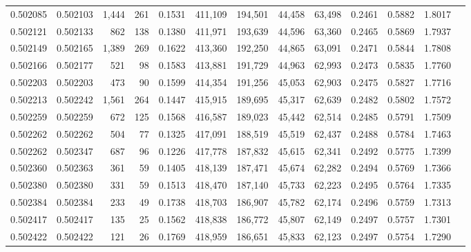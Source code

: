 \begin{tabular}{rrrrrrrrrrrrr}
0.502085 & 0.502103 & 1,444 &   261 &                                     0.1531 & 411,109 & 194,501 &  44,458 &  63,498 & 0.2461 & 0.5882 & 1.8017 \\
0.502121 & 0.502133 &   862 &   138 &                                     0.1380 & 411,971 & 193,639 &  44,596 &  63,360 & 0.2465 & 0.5869 & 1.7937 \\
0.502149 & 0.502165 & 1,389 &   269 &                                     0.1622 & 413,360 & 192,250 &  44,865 &  63,091 & 0.2471 & 0.5844 & 1.7808 \\
0.502166 & 0.502177 &   521 &    98 &                                     0.1583 & 413,881 & 191,729 &  44,963 &  62,993 & 0.2473 & 0.5835 & 1.7760 \\
0.502203 & 0.502203 &   473 &    90 &                                     0.1599 & 414,354 & 191,256 &  45,053 &  62,903 & 0.2475 & 0.5827 & 1.7716 \\
0.502213 & 0.502242 & 1,561 &   264 &                                     0.1447 & 415,915 & 189,695 &  45,317 &  62,639 & 0.2482 & 0.5802 & 1.7572 \\
0.502259 & 0.502259 &   672 &   125 &                                     0.1568 & 416,587 & 189,023 &  45,442 &  62,514 & 0.2485 & 0.5791 & 1.7509 \\
0.502262 & 0.502262 &   504 &    77 &                                     0.1325 & 417,091 & 188,519 &  45,519 &  62,437 & 0.2488 & 0.5784 & 1.7463 \\
0.502262 & 0.502347 &   687 &    96 &                                     0.1226 & 417,778 & 187,832 &  45,615 &  62,341 & 0.2492 & 0.5775 & 1.7399 \\
0.502360 & 0.502363 &   361 &    59 &                                     0.1405 & 418,139 & 187,471 &  45,674 &  62,282 & 0.2494 & 0.5769 & 1.7366 \\
0.502380 & 0.502380 &   331 &    59 &                                     0.1513 & 418,470 & 187,140 &  45,733 &  62,223 & 0.2495 & 0.5764 & 1.7335 \\
0.502384 & 0.502384 &   233 &    49 &                                     0.1738 & 418,703 & 186,907 &  45,782 &  62,174 & 0.2496 & 0.5759 & 1.7313 \\
0.502417 & 0.502417 &   135 &    25 &                                     0.1562 & 418,838 & 186,772 &  45,807 &  62,149 & 0.2497 & 0.5757 & 1.7301 \\
0.502422 & 0.502422 &   121 &    26 &                                     0.1769 & 418,959 & 186,651 &  45,833 &  62,123 & 0.2497 & 0.5754 & 1.7290 \\

\end{tabular}
